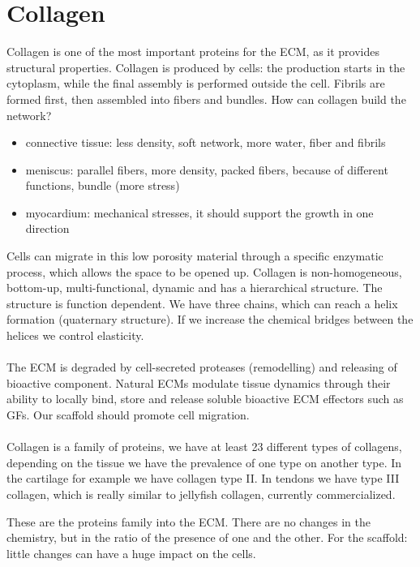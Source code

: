 
\section{Collagen}
Collagen is one of the most important proteins for the ECM, as it provides structural properties. Collagen is produced by cells: the production starts in the cytoplasm,  while the final assembly is performed outside the cell.
Fibrils are formed first, then assembled into fibers and bundles.
\noindent
How can collagen build the network?
\begin{itemize}
\item connective tissue: less density, soft network, more water, fiber and fibrils
\item meniscus: parallel fibers, more density, packed fibers, because of different functions, bundle (more stress)
\item myocardium: mechanical stresses, it should support the growth in one direction
\end{itemize}
\noindent
Cells can migrate in this low porosity material through a specific enzymatic process,  which allows the space to be opened up.
Collagen is non-homogeneous, bottom-up, multi-functional, dynamic and has a hierarchical structure. The structure is function dependent.
We have three chains,  which can reach a helix formation (quaternary structure). If we increase the chemical bridges between the helices we control elasticity.
\\
\\
\noindent
The ECM is degraded by cell-secreted proteases (remodelling) and releasing of bioactive component.
Natural ECMs modulate tissue dynamics through their ability to locally bind, store and release soluble bioactive ECM effectors such as GFs.
Our scaffold should promote cell migration.
\\
\\
\noindent
Collagen is a family of proteins, we have at least 23 different types of collagens, depending on the tissue we have the prevalence of one type on another type. In the cartilage for example we have collagen type II. In tendons we have type III collagen, which is really similar to jellyfish collagen, currently commercialized.

These are the proteins family into the ECM.
There are no changes in the chemistry, but in the ratio of the presence of one and the other.
For the scaffold: little changes can have a huge impact on the cells.

